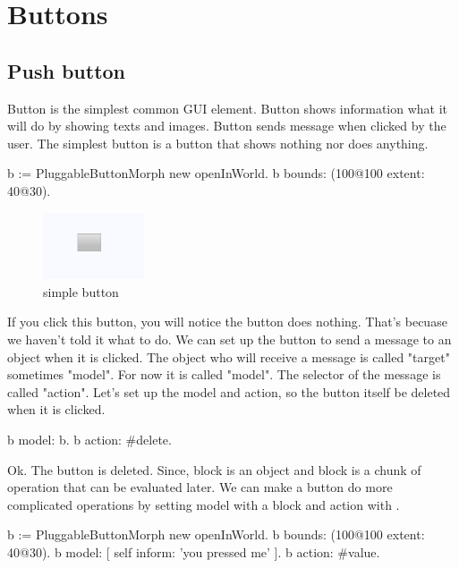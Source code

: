 \documentclass[a4paper,10pt,twoside]{book}
\begin{document}
\section{Buttons}
\subsection{Push button}
Button is the simplest common GUI element. Button shows information what it will do by showing texts and images. Button sends message when clicked by the user. The simplest button is a button that shows nothing nor does anything.

\begin{code}{}
b := PluggableButtonMorph new openInWorld.
b bounds: (100@100 extent: 40@30).
\end{code}

\begin{figure}[htbp]
\begin{center}
	\includegraphics[width=3.0cm]{SimpleButton}
	\caption{simple button}
\end{center}
\end{figure}

If you click this button, you will notice the button does nothing. That's becuase we haven't told it what to do. We can set up the button to send a message to an object when it is clicked. The object who will receive a message is called "target" sometimes "model". For now it is called "model". The selector of the message is called "action". Let's set up the model and action, so the button itself be deleted when it is clicked. 

\begin{code}{}
b model: b.
b action: #delete.
\end{code}

 
 Ok. The button is deleted. Since, block is an object and block is a chunk of operation that can be evaluated later. We can make a button do more complicated operations by setting model with a block and action with .

\begin{code}{}
b := PluggableButtonMorph new openInWorld.
b bounds: (100@100 extent: 40@30).
b model: [ self inform: 'you pressed me' ].
b action: #value.
\end{code}
 
\end{document}
